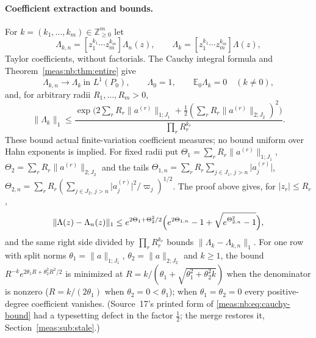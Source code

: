 \documentclass[11pt]{article}
\numberwithin{equation}{section}
\theoremstyle{definition}
\theoremstyle{remark}
\newcommand{\Z}{\mathbb Z}
\newcommand{\E}{\mathbb E}
\newcommand{\norm}[1]{\lVert#1\rVert}
\newcommand{\abs}[1]{\lvert#1\rvert}
\begin{document}
\paragraph{Coefficient extraction and bounds.} For
$k=(k_1,\ldots,k_m)\in\Z_{\ge0}^m$ let
\begin{equation}\label{meas:nb:eq:Taylor}
 \Lambda_{k,n}=[z_1^{k_1}\cdots z_m^{k_m}]\Lambda_n(z),\qquad
 \Lambda_k=[z_1^{k_1}\cdots z_m^{k_m}]\Lambda(z),
\end{equation}
Taylor coefficients, without factorials. The Cauchy integral formula and
Theorem~\ref{meas:nb:thm:entire} give
\begin{equation}\label{meas:nb:eq:coefficient-L1}
 \Lambda_{k,n}\longrightarrow\Lambda_k\ \text{in }L^1(P_0),\qquad
 \Lambda_0=1,\qquad \E_0\Lambda_k=0\quad(k\ne0),
\end{equation}
and, for arbitrary radii $R_1,\ldots,R_m>0$,
\begin{equation}\label{meas:nb:eq:cauchy-bound}
 \norm{\Lambda_k}_1\le
 \frac{\exp\bigl(2\sum_rR_r\norm{a^{(r)}}_{1;J_1}
       +\frac12(\sum_rR_r\norm{a^{(r)}}_{2;J_2})^2\bigr)}{\prod_rR_r^{k_r}} .
\end{equation}
These bound actual finite-variation coefficient measures; no bound uniform over
Hahn exponents is implied. For fixed radii put
$\Theta_1=\sum_rR_r\norm{a^{(r)}}_{1;J_1}$, $\Theta_2=\sum_rR_r\norm{a^{(r)}}_{2;J_2}$ and
the tails
$\Theta_{1,n}=\sum_rR_r\sum_{j\in J_1,\,j>n}\abs{a_j^{(r)}}$,
$\Theta_{2,n}=\sum_rR_r(\sum_{j\in J_2,\,j>n}\abs{a_j^{(r)}}^2/\varpi_j)^{1/2}$. The proof
above gives, for $\abs{z_r}\le R_r$,
\begin{equation}\label{meas:nb:eq:uniform-tail}
 \norm{\Lambda(z)-\Lambda_n(z)}_1\le e^{2\Theta_1+\Theta_2^2/2}
 \Bigl(e^{2\Theta_{1,n}}-1+\sqrt{e^{\Theta_{2,n}^2}-1}\Bigr),
\end{equation}
and the same right side divided by $\prod_rR_r^{k_r}$ bounds
$\norm{\Lambda_k-\Lambda_{k,n}}_1$. For one row with split norms
$\theta_1=\norm a_{1;J_1}$, $\theta_2=\norm a_{2;J_2}$ and $k\ge1$, the bound
$R^{-k}e^{2\theta_1R+\theta_2^2R^2/2}$ is minimized at
$R=k/(\theta_1+\sqrt{\theta_1^2+\theta_2^2k})$ when the denominator is nonzero
($R=k/(2\theta_1)$ when $\theta_2=0<\theta_1$); when $\theta_1=\theta_2=0$ every
positive-degree coefficient vanishes. (Source~17's printed form of
\eqref{meas:nb:eq:cauchy-bound} had a typesetting defect in the factor $\frac12$;
the merge restores it, Section~\ref{meas:sub:stale}.)
\end{document}
